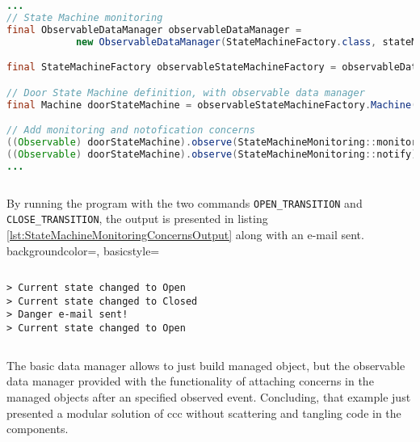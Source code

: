 \begin{sourcecode} [H]
	\begin{lstlisting}[language=Java, escapechar=|]
...
// State Machine monitoring
final ObservableDataManager observableDataManager = 
			new ObservableDataManager(StateMachineFactory.class, stateMachineSchema);

final StateMachineFactory observableStateMachineFactory = observableDataManager.make();

// Door State Machine definition, with observable data manager
final Machine doorStateMachine = observableStateMachineFactory.Machine();

// Add monitoring and notofication concerns
((Observable) doorStateMachine).observe(StateMachineMonitoring::monitor); |\label{line:state_machine_monitor}|
((Observable) doorStateMachine).observe(StateMachineMonitoring::notify);  |\label{line:state_machine_notify}|
...
	\end{lstlisting}
	\caption{Door state machine with concerns}
	\label{lst:StateMachineMonitoringConcerns}
\end{sourcecode}

By running the program with the two commands \texttt{OPEN\_TRANSITION} and \texttt{CLOSE\_TRANSITION}, the output is presented in listing \ref{lst:StateMachineMonitoringConcernsOutput} along with an e-mail sent.
 {
    backgroundcolor=\color{white},
    basicstyle=\scriptsize\color{black}\ttfamily
}

\begin{sourcecode} [H]
	\lstset{numbers=none}
	\begin{lstlisting}[style=Bash]
> Current state changed to Open
> Current state changed to Closed
> Danger e-mail sent!
> Current state changed to Open
	\end{lstlisting}
	\caption{Door state machine with concerns: output}
	\label{lst:StateMachineMonitoringConcernsOutput}
\end{sourcecode}

The basic data manager allows to just build managed object, but the observable data manager provided with the functionality of attaching concerns in the managed objects after an specified observed event.
Concluding, that example just presented a modular solution of \ac{ccc} without scattering and tangling code in the components.
